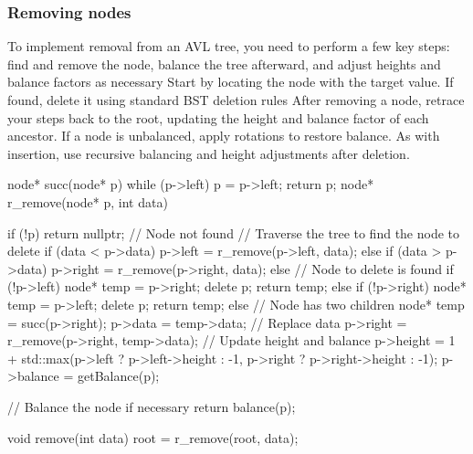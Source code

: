 \documentclass{report}
\begin{document}
\pagebreak 
\subsubsection{Removing nodes}
\bigbreak \noindent 
To implement removal from an AVL tree, you need to perform a few key steps: find and remove the node, balance the tree afterward, and adjust heights and balance factors as necessary
\bigbreak \noindent 
Start by locating the node with the target value. If found, delete it using standard BST deletion rules
\bigbreak \noindent 
After removing a node, retrace your steps back to the root, updating the height and balance factor of each ancestor. If a node is unbalanced, apply rotations to restore balance.
\bigbreak \noindent 
As with insertion, use recursive balancing and height adjustments after deletion.
\bigbreak \noindent 
\begin{cppcode}
    node* succ(node* p) {
        while (p->left) p = p->left;
        return p;
    }
    node* r_remove(node* p, int data) {
        if (!p) return nullptr;  // Node not found
        // Traverse the tree to find the node to delete
        if (data < p->data) {
            p->left = r_remove(p->left, data);
        } else if (data > p->data) {
            p->right = r_remove(p->right, data);
        } else {  // Node to delete is found
            if (!p->left) {
                node* temp = p->right;
                delete p;
                return temp;
            } else if (!p->right) {
                node* temp = p->left;
                delete p;
                return temp;
            } else {  // Node has two children
                node* temp = succ(p->right);
                p->data = temp->data;  // Replace data
                p->right = r_remove(p->right, temp->data); 
            }
        }
        // Update height and balance
        p->height = 1 + std::max(p->left ? p->left->height : -1, p->right ? p->right->height : -1);
        p->balance = getBalance(p);

        // Balance the node if necessary
        return balance(p);
    }
    void remove(int data) {
        root = r_remove(root, data);
    }
\end{cppcode}
\end{document}
